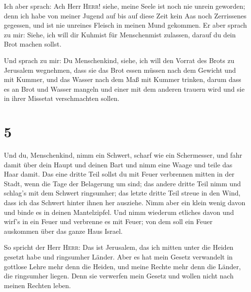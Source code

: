  Ich aber sprach: Ach Herr \textsc{Herr}! siehe, meine
Seele ist noch nie unrein geworden; denn ich habe von meiner Jugend auf
bis auf diese Zeit kein Aas noch Zerrissenes gegessen, und ist nie
unreines Fleisch in meinen Mund gekommen.  Er aber sprach
zu mir: Siehe, ich will dir Kuhmist für Menschenmist zulassen, darauf du
dein Brot machen sollst.

 Und sprach zu mir: Du Menschenkind, siehe, ich will den
Vorrat des Brots zu Jerusalem wegnehmen, dass sie das Brot essen müssen
nach dem Gewicht und mit Kummer, und das Wasser nach dem Maß mit Kummer
trinken,  darum dass es an Brot und Wasser mangeln und
einer mit dem anderen trauern wird und sie in ihrer Missetat
verschmachten sollen.

\hypertarget{section-4}{%
\section{5}\label{section-4}}

 Und du, Menschenkind, nimm ein Schwert, scharf wie ein
Schermesser, und fahr damit über dein Haupt und deinen Bart und nimm
eine Waage und teile das Haar damit.  Das eine dritte Teil
sollst du mit Feuer verbrennen mitten in der Stadt, wenn die Tage der
Belagerung um sind; das andere dritte Teil nimm und schlag's mit dem
Schwert ringsumher; das letzte dritte Teil streue in den Wind, dass ich
das Schwert hinter ihnen her ausziehe.  Nimm aber ein
klein wenig davon und binde es in deinen Mantelzipfel. 
Und nimm wiederum etliches davon und wirf's in ein Feuer und verbrenne
es mit Feuer; von dem soll ein Feuer auskommen über das ganze Haus
Israel.

 So spricht der Herr \textsc{Herr}: Das ist Jerusalem, das
ich mitten unter die Heiden gesetzt habe und ringsumher Länder.
 Aber es hat mein Gesetz verwandelt in gottlose Lehre mehr
denn die Heiden, und meine Rechte mehr denn die Länder, die ringsumher
liegen. Denn sie verwerfen mein Gesetz und wollen nicht nach meinen
Rechten leben.

